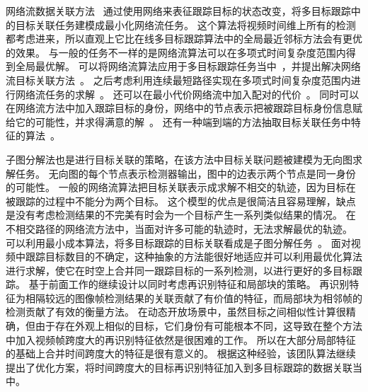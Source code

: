 %
网络流数据关联方法~\cite{wang2016joint,schulter2017deep,net_flow} 通过使用网络来表征跟踪目标的状态改变，将多目标跟踪中的目标关联任务建模成最小化网络流任务。
这个算法将视频时间维上所有的检测都考虑进来，所以直观上它比在线多目标跟踪算法中的全局最近邻标方法会有更优的效果。
与一般的任务不一样的是网络流算法可以在多项式时间复杂度范围内得到全局最优解。
可以将网络流算法应用于多目标跟踪任务当中~\cite{zhang2008global}，并提出解决网络流目标关联方法~\cite{efficient1990}。
之后考虑利用连续最短路径实现在多项式时间复杂度范围内进行网络流任务的求解~\cite{2011globally-optimal}。
还可以在最小代价网络流中加入配对的代价~\cite{chari2015on}。
同时可以在网络流方法中加入跟踪目标的身份，网络中的节点表示把被跟踪目标身份信息赋给它的可能性，并求得满意的解~\cite{2015target}。
还有一种端到端的方法抽取目标关联任务中特征的算法~\cite{schulter2017deep}。

子图分解法也是进行目标关联的策略，在该方法中目标关联问题被建模为无向图求解任务。
无向图的每个节点表示检测器输出，图中的边表示两个节点是同一身份的可能性。
一般的网络流算法把目标关联表示成求解不相交的轨迹，因为目标在被跟踪的过程中不能分为两个目标。
这个模型的优点是很简洁且容易理解，缺点是没有考虑检测结果的不完美有时会为一个目标产生一系列类似结果的情况。
在不相交路径的网络流方法中，当面对许多可能的轨迹时，无法求解最优的轨迹。
可以利用最小成本算法，将多目标跟踪的目标关联看成是子图分解任务~\cite{tang2015subgraph}。
面对视频中跟踪目标数目的不确定，这种抽象的方法能很好地适应并可以利用最优化算法进行求解，使它在时空上合并同一跟踪目标的一系列检测，以进行更好的多目标跟踪。
基于前面工作的继续设计以同时考虑再识别特征和局部块的策略。
再识别特征为相隔较远的图像帧检测结果的关联贡献了有价值的特征，而局部块为相邻帧的检测贡献了有效的衡量方法。
在动态开放场景中，虽然目标之间相似性计算很精确，但由于存在外观上相似的目标，它们身份有可能根本不同，这导致在整个方法中加入视频帧跨度大的再识别特征依然是很困难的工作。
所以在大部分局部特征的基础上合并时间跨度大的特征是很有意义的。
根据这种经验，该团队算法继续提出了优化方案，将时间跨度大的目标再识别特征加入到多目标跟踪的数据关联当中。


